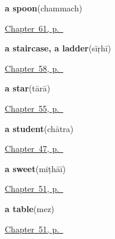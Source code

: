 \noindent\begin{minipage}[t]{\linewidth}
\raggedright
\textbf{a spoon}\enspace\emph{}\enspace(chammach)\par
\footnotesize \hyperref[ch:hi-at-the-cooking-fire]{Chapter~61, p.~\pageref*{ch:hi-at-the-cooking-fire}}
\end{minipage}\par\smallskip

\noindent\begin{minipage}[t]{\linewidth}
\raggedright
\textbf{a staircase, a ladder}\enspace\emph{}\enspace(sīṛhī)\par
\footnotesize \hyperref[ch:hi-inside-the-house]{Chapter~58, p.~\pageref*{ch:hi-inside-the-house}}
\end{minipage}\par\smallskip

\noindent\begin{minipage}[t]{\linewidth}
\raggedright
\textbf{a star}\enspace\emph{}\enspace(tārā)\par
\footnotesize \hyperref[ch:hi-the-sky]{Chapter~55, p.~\pageref*{ch:hi-the-sky}}
\end{minipage}\par\smallskip

\noindent\begin{minipage}[t]{\linewidth}
\raggedright
\textbf{a student}\enspace\emph{}\enspace(chātra)\par
\footnotesize \hyperref[ch:hi-roles]{Chapter~47, p.~\pageref*{ch:hi-roles}}
\end{minipage}\par\smallskip

\noindent\begin{minipage}[t]{\linewidth}
\raggedright
\textbf{a sweet}\enspace\emph{}\enspace(miṭhāī)\par
\footnotesize \hyperref[ch:hi-welcoming-a-guest]{Chapter~51, p.~\pageref*{ch:hi-welcoming-a-guest}}
\end{minipage}\par\smallskip

\noindent\begin{minipage}[t]{\linewidth}
\raggedright
\textbf{a table}\enspace\emph{}\enspace(mez)\par
\footnotesize \hyperref[ch:hi-welcoming-a-guest]{Chapter~51, p.~\pageref*{ch:hi-welcoming-a-guest}}
\end{minipage}\par\smallskip

